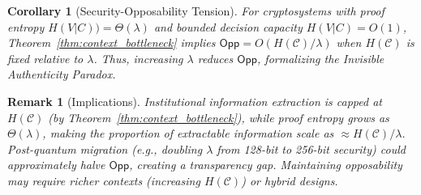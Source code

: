\documentclass{ieeeaccess}
\newtheorem{corollary}{Corollary}[subsection]
\newtheorem{remark}{Remark}[subsection]
\begin{document}
\begin{corollary}[Security-Opposability Tension]\label{cor:security_opp_tension}
For cryptosystems with proof entropy $H(V|C)) = \Theta(\lambda)$ and bounded decision capacity $H(V|C) = O(1)$, Theorem~\ref{thm:context_bottleneck} implies $\mathsf{Opp} = O(H(\mathcal{C})/\lambda)$ when $H(\mathcal{C})$ is fixed relative to $\lambda$. Thus, increasing $\lambda$ reduces $\mathsf{Opp}$, formalizing the \emph{Invisible Authenticity Paradox}.
\end{corollary}

\begin{remark}[Implications]
Institutional information extraction is capped at $H(\mathcal{C})$ (by Theorem~\ref{thm:context_bottleneck}), while proof entropy grows as $\Theta(\lambda)$, making the proportion of extractable information scale as $\approx H(\mathcal{C})/\lambda$. Post-quantum migration (e.g., doubling $\lambda$ from 128-bit to 256-bit security) could approximately halve $\mathsf{Opp}$, creating a \emph{transparency gap}. Maintaining opposability may require richer contexts (increasing $H(\mathcal{C})$) or hybrid designs.
\end{remark}
\end{document}
